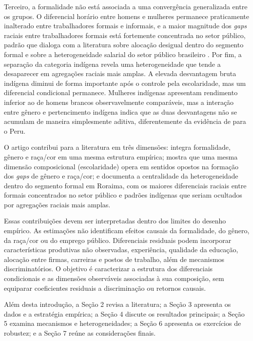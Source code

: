 \documentclass[12pt,a4paper]{article}
\begin{document}
Terceiro, a formalidade não está associada a uma convergência generalizada entre os
grupos. O diferencial horário entre homens e mulheres permanece praticamente inalterado
entre trabalhadores formais e informais, e a maior magnitude dos \textit{gaps} raciais
entre trabalhadores formais está fortemente concentrada no setor público, padrão que
dialoga com a literatura sobre alocação desigual dentro do segmento formal e sobre a
heterogeneidade salarial do setor público brasileiro \citep{gerard2021, baez2021}. Por
fim, a separação da categoria indígena revela uma heterogeneidade que tende a desaparecer
em agregações raciais mais amplas. A elevada desvantagem bruta indígena diminui de forma
importante após o controle pela escolaridade, mas um diferencial condicional permanece.
Mulheres indígenas apresentam rendimento inferior ao de homens brancos observavelmente
comparáveis, mas a interação entre gênero e pertencimento indígena indica que as duas
desvantagens não se acumulam de maneira simplesmente aditiva, diferentemente da
evidência de \citet{kolev2015} para o Peru.

O artigo contribui para a literatura em três dimensões: integra formalidade, gênero e
raça/cor em uma mesma estrutura empírica; mostra que uma mesma dimensão composicional
(escolaridade) opera em sentidos opostos na formação dos \textit{gaps} de gênero e
raça/cor; e documenta a centralidade da heterogeneidade dentro do segmento formal em
Roraima, com os maiores diferenciais raciais entre formais concentrados no setor público
e padrões indígenas que seriam ocultados por agregações raciais mais amplas.

Essas contribuições devem ser interpretadas dentro dos limites do desenho empírico.
As estimações não identificam efeitos causais da formalidade, do gênero, da raça/cor
ou do emprego público. Diferenciais residuais podem incorporar características produtivas
não observadas, experiência, qualidade da educação, alocação entre firmas, carreiras e
postos de trabalho, além de mecanismos discriminatórios. O objetivo é caracterizar a
estrutura dos diferenciais condicionais e as dimensões observáveis associadas à sua
composição, sem equiparar coeficientes residuais a discriminação ou retornos causais.

Além desta introdução, a Seção 2 revisa a literatura; a Seção 3 apresenta os dados e a
estratégia empírica; a Seção 4 discute os resultados principais; a Seção 5 examina
mecanismos e heterogeneidades; a Seção 6 apresenta os exercícios de robustez; e a
Seção 7 reúne as considerações finais.
\end{document}
